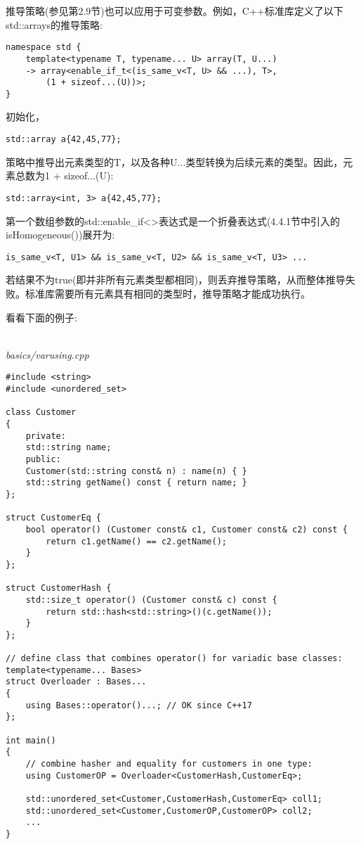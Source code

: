 推导策略(参见第2.9节)也可以应用于可变参数。例如，C++标准库定义了以下std::arrays的推导策略:

\begin{lstlisting}[style=styleCXX]
namespace std {
	template<typename T, typename... U> array(T, U...)
	-> array<enable_if_t<(is_same_v<T, U> && ...), T>,
		(1 + sizeof...(U))>;
}
\end{lstlisting}

初始化，

\begin{lstlisting}[style=styleCXX]
std::array a{42,45,77};
\end{lstlisting}

策略中推导出元素类型的T，以及各种U...类型转换为后续元素的类型。因此，元素总数为1 + sizeof...(U):

\begin{lstlisting}[style=styleCXX]
std::array<int, 3> a{42,45,77};
\end{lstlisting}

第一个数组参数的std::enable\_if<>表达式是一个折叠表达式(4.4.1节中引入的isHomogeneous())展开为:

\begin{lstlisting}[style=styleCXX]
is_same_v<T, U1> && is_same_v<T, U2> && is_same_v<T, U3> ...
\end{lstlisting}

若结果不为true(即并非所有元素类型都相同)，则丢弃推导策略，从而整体推导失败。标准库需要所有元素具有相同的类型时，推导策略才能成功执行。


看看下面的例子:

\hspace*{\fill} \\ %
\noindent
\textit{basics/varusing.cpp}
\begin{lstlisting}[style=styleCXX]
#include <string>
#include <unordered_set>

class Customer
{
	private:
	std::string name;
	public:
	Customer(std::string const& n) : name(n) { }
	std::string getName() const { return name; }
};

struct CustomerEq {
	bool operator() (Customer const& c1, Customer const& c2) const {
		return c1.getName() == c2.getName();
	}
};

struct CustomerHash {
	std::size_t operator() (Customer const& c) const {
		return std::hash<std::string>()(c.getName());
	}
};

// define class that combines operator() for variadic base classes:
template<typename... Bases>
struct Overloader : Bases...
{
	using Bases::operator()...; // OK since C++17
};

int main()
{
	// combine hasher and equality for customers in one type:
	using CustomerOP = Overloader<CustomerHash,CustomerEq>;
	
	std::unordered_set<Customer,CustomerHash,CustomerEq> coll1;
	std::unordered_set<Customer,CustomerOP,CustomerOP> coll2;
	...
}
\end{lstlisting}

